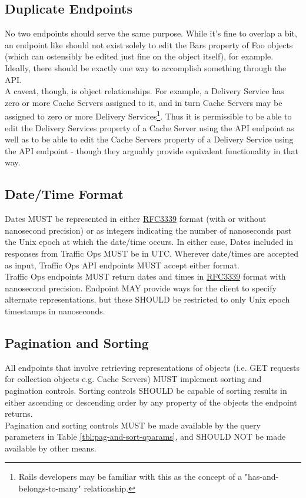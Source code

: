 \subsection{Duplicate Endpoints\label{sec:duplicate-endpoints}}
No two endpoints should serve the same purpose. While it's fine to overlap a bit, an endpoint like  should not exist solely to
edit the Bars property of Foo objects (which can ostensibly be edited just fine on the object itself), for example. Ideally, there should be
exactly one way to accomplish something through the API.\\
A caveat, though, is object relationships. For example, a Delivery Service has zero or more Cache Servers assigned to it, and in turn Cache
Servers may be assigned to zero or more Delivery Services\footnote{Rails developers may be familiar with this as the concept of a
"has-and-belongs-to-many" relationship.}. Thus it is permissible to be able to edit the Delivery Services property of a Cache Server using the
 API endpoint as well as to be able to edit the Cache Servers property of a Delivery Service using the
 API endpoint - though they arguably provide equivalent functionality in that way.

\subsection{Date/Time Format\label{sec:datetime}}
Dates MUST be represented in either \href{https://tools.ietf.org/html/rfc3339}{RFC3339} format (with or without nanosecond precision) or as
integers indicating the number of nanoseconds past the Unix epoch at which the date/time occurs. In either case, Dates included in responses
from Traffic Ops MUST be in UTC. Wherever date/times are accepted as input, Traffic Ops API endpoints MUST accept either format.\\
Traffic Ops endpoints MUST return dates and times in \href{https://tools.ietf.org/html/rfc3339}{RFC3339} format with nanosecond precision.
Endpoint MAY provide ways for the client to specify alternate representations, but these SHOULD be restricted to only Unix epoch timestamps
in nanoseconds.

\subsection{Pagination and Sorting\label{sec:pagination}}
All endpoints that involve retrieving representations of objects (i.e. GET requests for collection objects e.g. Cache Servers) MUST implement
sorting and pagination controls. Sorting controls SHOULD be capable of sorting results in either ascending or descending order by any property
of the objects the endpoint returns.\\
Pagination and sorting controls MUST be made available by the query parameters in Table \ref{tbl:pag-and-sort-qparams}, and SHOULD NOT be made
available by other means.


